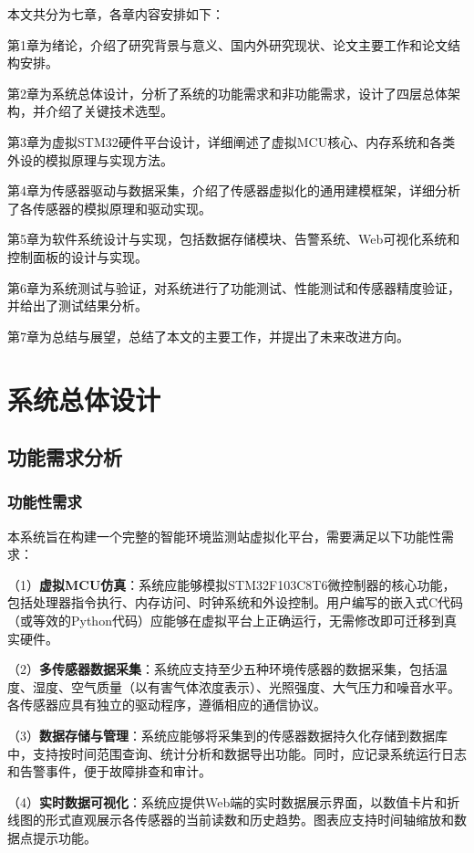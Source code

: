 \documentclass[12pt,a4paper]{ctexart}
\begin{document}
本文共分为七章，各章内容安排如下：

第1章为绪论，介绍了研究背景与意义、国内外研究现状、论文主要工作和论文结构安排。

第2章为系统总体设计，分析了系统的功能需求和非功能需求，设计了四层总体架构，并介绍了关键技术选型。

第3章为虚拟STM32硬件平台设计，详细阐述了虚拟MCU核心、内存系统和各类外设的模拟原理与实现方法。

第4章为传感器驱动与数据采集，介绍了传感器虚拟化的通用建模框架，详细分析了各传感器的模拟原理和驱动实现。

第5章为软件系统设计与实现，包括数据存储模块、告警系统、Web可视化系统和控制面板的设计与实现。

第6章为系统测试与验证，对系统进行了功能测试、性能测试和传感器精度验证，并给出了测试结果分析。

第7章为总结与展望，总结了本文的主要工作，并提出了未来改进方向。

\section{系统总体设计}

\subsection{功能需求分析}

\subsubsection{功能性需求}

本系统旨在构建一个完整的智能环境监测站虚拟化平台，需要满足以下功能性需求：

（1）\textbf{虚拟MCU仿真}：系统应能够模拟STM32F103C8T6微控制器的核心功能，包括处理器指令执行、内存访问、时钟系统和外设控制。用户编写的嵌入式C代码（或等效的Python代码）应能够在虚拟平台上正确运行，无需修改即可迁移到真实硬件。

（2）\textbf{多传感器数据采集}：系统应支持至少五种环境传感器的数据采集，包括温度、湿度、空气质量（以有害气体浓度表示）、光照强度、大气压力和噪音水平。各传感器应具有独立的驱动程序，遵循相应的通信协议。

（3）\textbf{数据存储与管理}：系统应能够将采集到的传感器数据持久化存储到数据库中，支持按时间范围查询、统计分析和数据导出功能。同时，应记录系统运行日志和告警事件，便于故障排查和审计。

（4）\textbf{实时数据可视化}：系统应提供Web端的实时数据展示界面，以数值卡片和折线图的形式直观展示各传感器的当前读数和历史趋势。图表应支持时间轴缩放和数据点提示功能。
\end{document}
